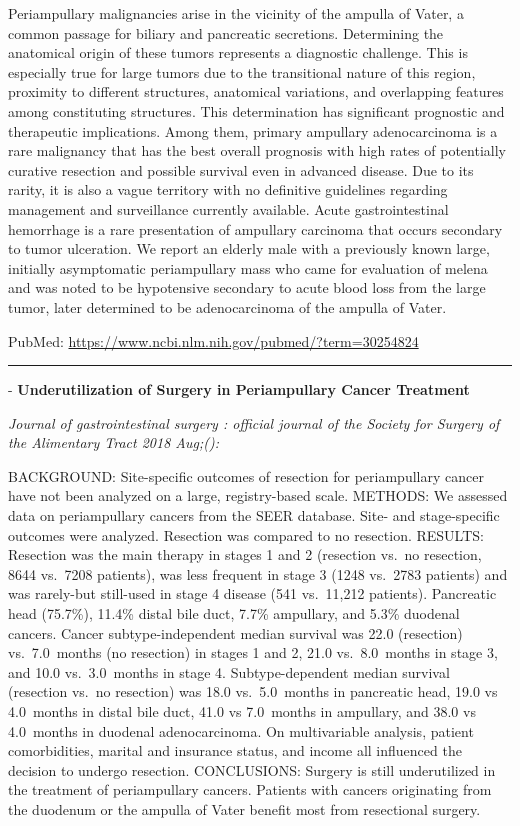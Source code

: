 \documentclass[]{article}
\begin{document}
Periampullary malignancies arise in the vicinity of the ampulla of
Vater, a common passage for biliary and pancreatic secretions.
Determining the anatomical origin of these tumors represents a
diagnostic challenge. This is especially true for large tumors due to
the transitional nature of this region, proximity to different
structures, anatomical variations, and overlapping features among
constituting structures. This determination has significant prognostic
and therapeutic implications. Among them, primary ampullary
adenocarcinoma is a rare malignancy that has the best overall prognosis
with high rates of potentially curative resection and possible survival
even in advanced disease. Due to its rarity, it is also a vague
territory with no definitive guidelines regarding management and
surveillance currently available. Acute gastrointestinal hemorrhage is a
rare presentation of ampullary carcinoma that occurs secondary to tumor
ulceration. We report an elderly male with a previously known large,
initially asymptomatic periampullary mass who came for evaluation of
melena and was noted to be hypotensive secondary to acute blood loss
from the large tumor, later determined to be adenocarcinoma of the
ampulla of Vater.

PubMed: \url{https://www.ncbi.nlm.nih.gov/pubmed/?term=30254824}

{}

{}

\begin{center}\rule{0.5\linewidth}{\linethickness}\end{center}

 - \textbf{Underutilization of Surgery in Periampullary Cancer
Treatment}

\emph{Journal of gastrointestinal surgery : official journal of the
Society for Surgery of the Alimentary Tract 2018 Aug;():}

BACKGROUND: Site-specific outcomes of resection for periampullary cancer
have not been analyzed on a large, registry-based scale. METHODS: We
assessed data on periampullary cancers from the SEER database. Site- and
stage-specific outcomes were analyzed. Resection was compared to no
resection. RESULTS: Resection was the main therapy in stages 1 and 2
(resection vs.~no resection, 8644 vs.~7208 patients), was less frequent
in stage 3 (1248 vs.~2783 patients) and was rarely-but still-used in
stage 4 disease (541 vs.~11,212 patients). Pancreatic head (75.7\%),
11.4\% distal bile duct, 7.7\% ampullary, and 5.3\% duodenal cancers.
Cancer subtype-independent median survival was 22.0 (resection)
vs.~7.0~months (no resection) in stages 1 and 2, 21.0 vs.~8.0~months in
stage 3, and 10.0 vs.~3.0~months in stage 4. Subtype-dependent median
survival (resection vs.~no resection) was 18.0 vs.~5.0~months in
pancreatic head, 19.0 vs 4.0~months in distal bile duct, 41.0 vs
7.0~months in ampullary, and 38.0 vs 4.0~months in duodenal
adenocarcinoma. On multivariable analysis, patient comorbidities,
marital and insurance status, and income all influenced the decision to
undergo resection. CONCLUSIONS: Surgery is still underutilized in the
treatment of periampullary cancers. Patients with cancers originating
from the duodenum or the ampulla of Vater benefit most from resectional
surgery.
\end{document}
